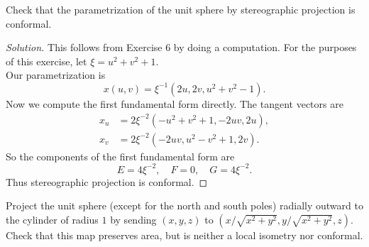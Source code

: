 \documentclass[Shifrin_Solutions_Spring_2015]{subfiles}
\begin{document}
\begin{exercise}
Check that the parametrization of the unit sphere by stereographic projection is conformal.
\end{exercise}

\begin{proof}[Solution] This follows from Exercise 6 by doing a computation. For the purposes of this exercise, let $\xi = u^2+v^2+1$.\\
Our parametrization is
\[
x(u,v) = \xi^{-1} \left( 2u , 2v , u^2 +v^2 -1 \right).
\]
Now we compute the first fundamental form directly. The tangent vectors are
\begin{align*}
x_u & = 2\xi^{-2} \left( -u^2+v^2+1 , -2uv , 2u\right) , \\
x_v &= 2\xi^{-2} \left( -2uv , u^2-v^2 +1 , 2v \right) .
\end{align*}
So the components of the first fundamental form are
\[
E  = 4\xi^{-2} , \quad F = 0 , \quad G = 4\xi^{-2} .
\]
Thus stereographic projection is conformal.
\end{proof}

\begin{exercise}
Project the unit sphere (except for the north and south poles) radially outward to the cylinder of radius $1$ by sending $(x,y,z)$ to $(x/\sqrt{x^2+y^2} , y/\sqrt{x^2+y^2} , z)$. Check that this map preserves area, but is neither a local isometry nor conformal.
\end{exercise}
\end{document}
